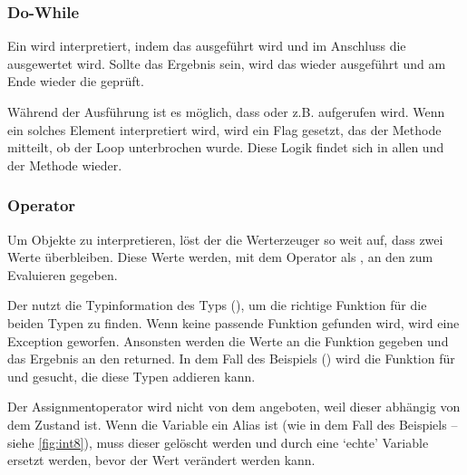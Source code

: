{    %
    \subsubsection{Do-While}
    \label{sssec:Do-While}
      Ein  wird interpretiert, indem das  ausgeführt wird und im Anschluss die  ausgewertet wird. Sollte das Ergebnis  sein, wird das  wieder ausgeführt und am Ende wieder die  geprüft.

      Während der Ausführung ist es möglich, dass  oder z.B.  aufgerufen wird. Wenn ein solches Element interpretiert wird, wird ein Flag gesetzt, das der  Methode mitteilt, ob der Loop unterbrochen wurde. Diese Logik findet sich in allen  und der  Methode wieder.

    \subsubsection{Operator}
    \label{sssec:Operator}
      Um  Objekte zu interpretieren, löst der  die Werterzeuger so weit auf, dass zwei  Werte überbleiben. Diese Werte werden, mit dem Operator als , an den  zum Evaluieren gegeben.

      Der  nutzt die Typinformation des  Typs (), um die richtige Funktion für die beiden Typen zu finden. Wenn keine passende Funktion gefunden wird, wird eine Exception geworfen. Ansonsten werden die Werte an die Funktion gegeben und das Ergebnis an den  returned. In dem Fall des Beispiels () wird die Funktion für  und  gesucht, die diese Typen addieren kann.

      Der Assignmentoperator wird nicht von dem  angeboten, weil dieser abhängig von dem  Zustand ist. Wenn die Variable ein Alias ist (wie in dem Fall des Beispiels -- siehe \autoref{fig:int8}), muss dieser gelöscht werden und durch eine `echte' Variable ersetzt werden, bevor der Wert verändert werden kann.

}
